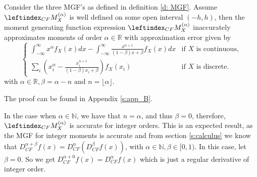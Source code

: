 \begin{theorem}\label{t: MGF_inaccurate}
    Consider the three MGF's as defined in definition \ref{d: MGF}. Assume \(\leftindex_{CF}{M}_X^{(\alpha)}\) is well defined on some open interval \((-h, h)\), then the moment generating function expression \(\leftindex_{CF}{M}_X^{(\alpha)}\) inaccurately approximates moments of order \(\alpha \in \mathbb{R}\) with approximation error given by
    \[
\begin{cases} 
    \displaystyle \int_{-\infty}^{\infty} x^\alpha  f_X(x) dx -  \displaystyle \int_{-\infty}^{\infty}  \frac{x^{n+1} }{(1 - \beta)x + \beta} f_X(x) dx & \text{if } X \text{ is continuous,} \\ 
    \displaystyle \sum_{i} \left(x_i^\alpha -  \frac{x_i^{n+1} }{(1 - \beta)x_i + \beta}\right) f_X(x_i) & \text{if } X \text{ is discrete.} 
\end{cases}
\] with \(\alpha \in \mathbb{R}, \beta = \alpha - n \text{ and } n = \lfloor \alpha \rfloor.\)
    
\end{theorem}
The proof can be found in Appendix \ref{s:app_B}.

\begin{remark}
    In the case when \(\alpha \in \mathbb{N}\), we have that \(n = \alpha\), and thus \( \beta = 0\), therefore, \(\leftindex_{CF}{M}_X^{(\alpha)}\) is accurate for integer orders. This is an expected result, as the MGF for integer moments is accurate and from section \ref{s:calculus} we know that \(D_{CF}^{\alpha + \beta}f(x) = D_{CF}^\alpha(D_{CF}^\beta f(x))\), with \(\alpha \in \mathbb{N}, \beta \in [0, 1).\) In this case, let \(\beta = 0\). So we get \(D_{CF}^{\alpha + 0}f(x) = D_{CF}^{\alpha}f(x)\) which is just a regular derivative of integer order.
\end{remark}
